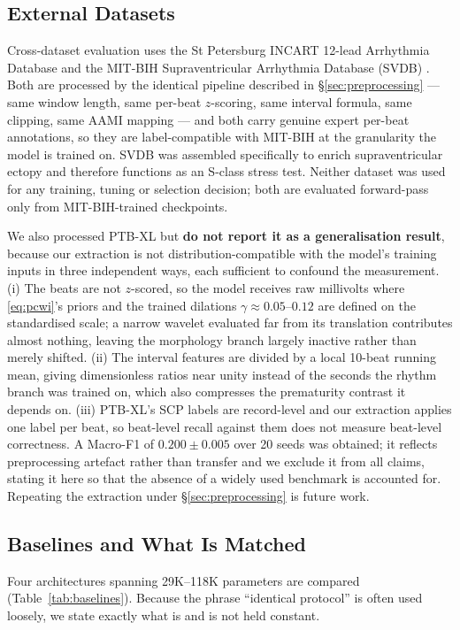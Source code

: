 \documentclass[journal,twoside,web]{ieeecolor}
\begin{document}
\subsection{External Datasets}
\label{sec:external_data}
Cross-dataset evaluation uses the St Petersburg INCART 12-lead Arrhythmia Database \cite{goldberger_physiobank_2000} and the MIT-BIH Supraventricular Arrhythmia Database (SVDB) \cite{greenwald_improved_1990}. Both are processed by the identical pipeline described in \S\ref{sec:preprocessing} --- same window length, same per-beat $z$-scoring, same interval formula, same clipping, same AAMI mapping --- and both carry genuine expert per-beat annotations, so they are label-compatible with MIT-BIH at the granularity the model is trained on. SVDB was assembled specifically to enrich supraventricular ectopy and therefore functions as an S-class stress test. Neither dataset was used for any training, tuning or selection decision; both are evaluated forward-pass only from MIT-BIH-trained checkpoints.

We also processed PTB-XL \cite{wagner_ptb-xl_2020} but \textbf{do not report it as a generalisation result}, because our extraction is not distribution-compatible with the model's training inputs in three independent ways, each sufficient to confound the measurement. (i) The beats are not $z$-scored, so the model receives raw millivolts where \eqref{eq:pcwi}'s priors and the trained dilations $\gamma\approx0.05$--$0.12$ are defined on the standardised scale; a narrow wavelet evaluated far from its translation contributes almost nothing, leaving the morphology branch largely inactive rather than merely shifted. (ii) The interval features are divided by a local 10-beat running mean, giving dimensionless ratios near unity instead of the seconds the rhythm branch was trained on, which also compresses the prematurity contrast it depends on. (iii) PTB-XL's SCP labels are record-level and our extraction applies one label per beat, so beat-level recall against them does not measure beat-level correctness. A Macro-F1 of $0.200\pm0.005$ over 20 seeds was obtained; it reflects preprocessing artefact rather than transfer and we exclude it from all claims, stating it here so that the absence of a widely used benchmark is accounted for. Repeating the extraction under \S\ref{sec:preprocessing} is future work.

\subsection{Baselines and What Is Matched}
\label{sec:baselines}
Four architectures spanning 29K--118K parameters are compared (Table~\ref{tab:baselines}). Because the phrase ``identical protocol'' is often used loosely, we state exactly what is and is not held constant.
\end{document}
